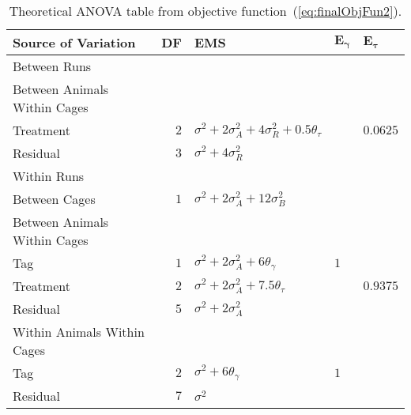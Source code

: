 \begin{table}[ht]
\centering
 \caption{Theoretical ANOVA table from objective function~(\ref{eq:finalObjFun2}).}
 \begin{tabular}[t]{lrlll} 
 \toprule 
 \multicolumn{1}{l}{\textbf{Source of Variation}} & \multicolumn{1}{l}{\textbf{DF}} & \multicolumn{1}{l}{\textbf{EMS}}& \multicolumn{1}{l}{$\bm{E_{\gamma}}$}&\multicolumn{1}{l}{$\bm{E_{\tau}}$}\\ 
 \midrule 
 Between Runs &  &  & & \\ 
 \quad Between Animals Within Cages &  &  & & \\ 
 \quad \quad Treatment & $2$ & $\sigma^2+2\sigma_{A}^2+4\sigma_{R}^2+0.5\theta_{\tau}$ & & $0.0625$\\ 
 \quad Residual & $3$ & $\sigma^2+4\sigma_{R}^2$ & & \\ \hline
 Within Runs &  &  & & \\ 
 \quad Between Cages & $1$ & $\sigma^2+2\sigma_{A}^2+12\sigma_{B}^2$ & & \\ \hline
 \quad Between Animals Within Cages &  &  & & \\ 
 \quad \quad Tag & $1$ & $\sigma^2+2\sigma_{A}^2+6\theta_{\gamma}$ &$1$ & \\ 
 \quad \quad Treatment & $2$ & $\sigma^2+2\sigma_{A}^2+ 7.5\theta_{\tau}$ & & $0.9375$\\ 
 \quad \quad Residual & $5$ & $\sigma^2+2\sigma_{A}^2$ & & \\ \hline
 \quad Within Animals Within Cages &  &  & & \\ 
 \quad \quad Tag & $2$ & $\sigma^2+6\theta_{\gamma}$ &$1$ & \\ 
 \quad \quad Residual & $7$ & $\sigma^2$ & & \\ 
 \bottomrule 
 \end{tabular} 
 \label{tab:Phase2ANOVA3Chap4} 
 

\end{table}
